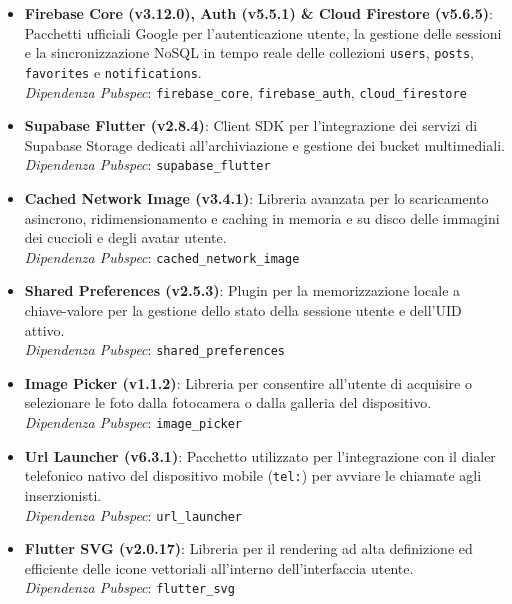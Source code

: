 \documentclass[a4paper]{report}
\begin{document}
\begin{itemize}
    \item \textbf{Firebase Core (v3.12.0), Auth (v5.5.1) \& Cloud Firestore (v5.6.5)}: Pacchetti ufficiali Google per l'autenticazione utente, la gestione delle sessioni e la sincronizzazione NoSQL in tempo reale delle collezioni \texttt{users}, \texttt{posts}, \texttt{favorites} e \texttt{notifications}. \\
    \textit{Dipendenza Pubspec}: \texttt{firebase\_core}, \texttt{firebase\_auth}, \texttt{cloud\_firestore}
    
    \item \textbf{Supabase Flutter (v2.8.4)}: Client SDK per l'integrazione dei servizi di Supabase Storage dedicati all'archiviazione e gestione dei bucket multimediali. \\
    \textit{Dipendenza Pubspec}: \texttt{supabase\_flutter}
    
    \item \textbf{Cached Network Image (v3.4.1)}: Libreria avanzata per lo scaricamento asincrono, ridimensionamento e caching in memoria e su disco delle immagini dei cuccioli e degli avatar utente. \\
    \textit{Dipendenza Pubspec}: \texttt{cached\_network\_image}
    
    \item \textbf{Shared Preferences (v2.5.3)}: Plugin per la memorizzazione locale a chiave-valore per la gestione dello stato della sessione utente e dell'UID attivo. \\
    \textit{Dipendenza Pubspec}: \texttt{shared\_preferences}
    
    \item \textbf{Image Picker (v1.1.2)}: Libreria per consentire all'utente di acquisire o selezionare le foto dalla fotocamera o dalla galleria del dispositivo. \\
    \textit{Dipendenza Pubspec}: \texttt{image\_picker}
    
    \item \textbf{Url Launcher (v6.3.1)}: Pacchetto utilizzato per l'integrazione con il dialer telefonico nativo del dispositivo mobile (\texttt{tel:}) per avviare le chiamate agli inserzionisti. \\
    \textit{Dipendenza Pubspec}: \texttt{url\_launcher}
    
    \item \textbf{Flutter SVG (v2.0.17)}: Libreria per il rendering ad alta definizione ed efficiente delle icone vettoriali all'interno dell'interfaccia utente. \\
    \textit{Dipendenza Pubspec}: \texttt{flutter\_svg}
\end{itemize}
\end{document}
